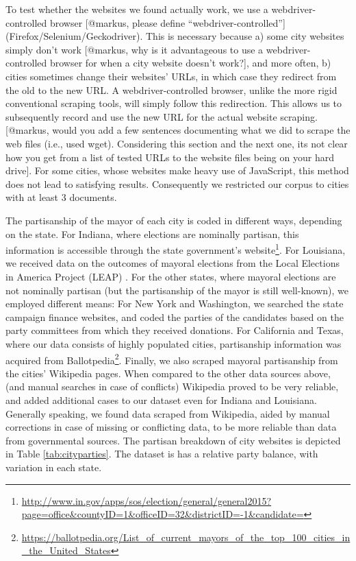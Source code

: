 \documentclass[11pt]{article}
\begin{document}
To test whether the websites we found actually work, we use a webdriver-controlled browser [@markus, please define ``webdriver-controlled''] (Firefox/Selenium/Geckodriver). This is necessary because a) some city websites simply don't work  [@markus, why is it advantageous to use a webdriver-controlled browser for when a city website doesn't work?], and more often, b) cities sometimes change their websites' URLs, in which case they redirect from the old to the new URL. A webdriver-controlled browser, unlike the more rigid conventional scraping tools, will simply follow this redirection. This allows us to subsequently record and use the new URL for the actual website scraping. [@markus, would you add a few sentences documenting what we did to scrape the web files (i.e., used wget). Considering this section and the next one, its not clear how you get from a list of tested URLs to the website files being on your hard drive]. For some cities, whose websites make heavy use of JavaScript, this method does not lead to satisfying results. Consequently we restricted our corpus to cities with at least 3 documents.

The partisanship of the mayor of each city is coded in different ways, depending on the state. For Indiana, where elections are nominally partisan, this information is accessible through the state government's website\footnote{\url{http://www.in.gov/apps/sos/election/general/general2015?page=office&countyID=1&officeID=32&districtID=-1&candidate=}}. For Louisiana, we received data on the outcomes of mayoral elections from the Local Elections in America Project (LEAP) \citep{marschall2013local}. For the other states, where mayoral elections are not nominally partisan (but the partisanship of the mayor is still well-known), we employed different means: For New York and Washington, we searched the state campaign finance websites, and coded the parties of the candidates based on the party committees from which they received donations. For California and Texas, where our data consists of highly populated cities, partisanship information was acquired from Ballotpedia\footnote{\url{https://ballotpedia.org/List_of_current_mayors_of_the_top_100_cities_in_the_United_States}}. Finally, we also scraped mayoral partisanship from the cities' Wikipedia pages. When compared to the other data sources above, (and manual searches in case of conflicts) Wikipedia proved to be very reliable, and added additional cases to our dataset even for Indiana and Louisiana. Generally speaking, we found data scraped from Wikipedia, aided by manual corrections in case of missing or conflicting data, to be more reliable than data from governmental sources. The partisan breakdown of city websites is depicted in Table \ref{tab:cityparties}. The dataset is has a relative party balance, with variation in each state.
\end{document}
